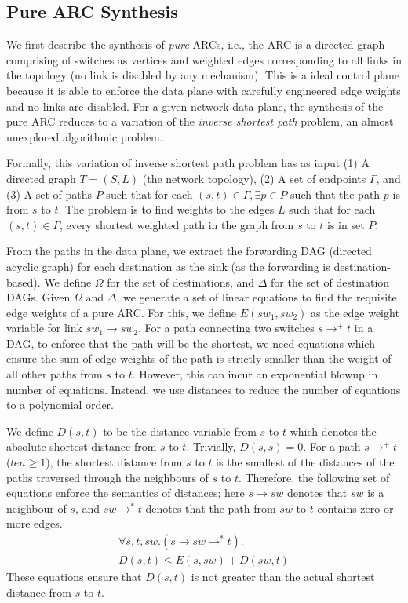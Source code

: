 \subsection{Pure ARC Synthesis}
We first describe the synthesis of {\em pure} ARCs, i.e.,
the ARC is a directed graph comprising of switches as 
vertices and weighted edges corresponding to all links in the
topology (no link is disabled by any mechanism). This is 
a ideal control plane because it is able to enforce the data plane
with carefully engineered edge weights and no links are disabled. 
For a given network data plane, the synthesis of 
the pure ARC reduces to a
variation of the {\em inverse shortest path} problem, an almost 
unexplored algorithmic problem. 

Formally, this variation of inverse shortest path problem 
has as input (1) A directed graph $T = (S, L)$ (the network topology), 
(2) A set of endpoints $\Gamma$, and 
(3) A set of paths $P$
such that for each $(s,t) \in \Gamma, \exists p \in P$ such
that the path $p$ is from $s$ to $t$. 
The problem is to find weights to the edges $L$ such that 
for each $(s,t) \in \Gamma$, every shortest weighted path 
in the graph 
from $s$ to $t$ is in set $P$. 

From the paths in the data plane, 
we extract the forwarding
DAG (directed acyclic graph) for each destination
as the sink (as the forwarding is destination-based). 
We define $\Omega$ for the 
set of destinations, and $\Delta$ for  
the set of destination DAGs. 
Given $\Omega$ and $\Delta$, we generate a set of linear equations
to find the requisite edge weights of a pure ARC. 
For this, we define $E(sw_1, sw_2)$ as
the edge weight variable for link $sw_1 \rightarrow sw_2$. 
For a path connecting two switches 
$s \rightarrow^+ t$ in a DAG, 
to enforce that the path will be the shortest, we need equations
which ensure the sum of edge weights of the path is strictly smaller than
the weight of all other paths from $s$ to $t$. However, this can incur
an exponential blowup in number of equations. Instead, we use distances 
to reduce the number of equations to a polynomial order. 

We define $D(s,t)$ to be the distance variable from $s$ to $t$
which denotes the absolute shortest distance from $s$ to $t$. 
Trivially, $D(s,s) = 0$. For a path $s \rightarrow^+ t$ ($len \geq 1$),
the shortest distance from $s$ to $t$ is the smallest of the distances
of the paths traversed through the neighbours of $s$ to $t$. Therefore, the
following set of equations enforce the semantics of distances; 
here $s \rightarrow sw$ denotes that $sw$ is a neighbour
of $s$, and $sw \rightarrow^* t$ denotes that the path from $sw$ to $t$ contains
zero or more edges.
\begin{multline} \label{eq:dist}
\forall s, t, sw. (s \rightarrow sw \rightarrow^* t).\\
D(s, t) \leq E(s, sw) + D(sw, t)
\end{multline}
These equations ensure that $D(s,t)$ is not greater than 
the actual shortest distance from $s$ to $t$.

